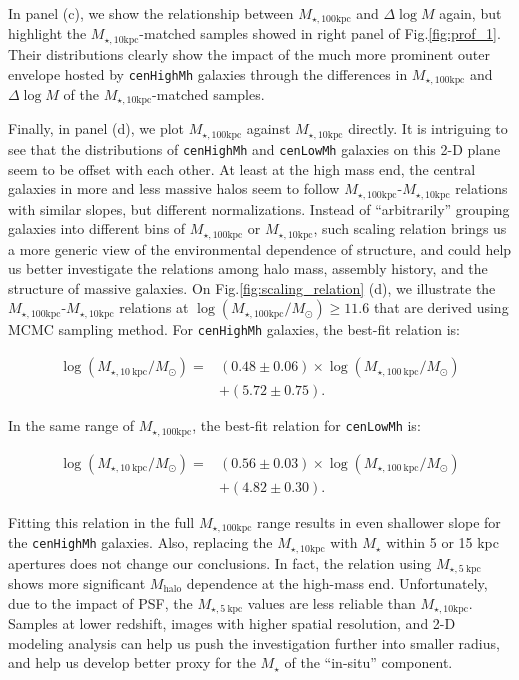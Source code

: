 \documentclass{emulateapj}
\def\rbcg{\texttt{cenHighMh}}
\def\nbcg{\texttt{cenLowMh}}
\def\mstar{{$M_{\star}$}}
\def\mhalo{{$M_{\mathrm{halo}}$}}
\def\minn{{$M_{\star,10\mathrm{kpc}}$}}
\def\mtot{{$M_{\star,100\mathrm{kpc}}$}}
\def\logmtot{{$\log (M_{\star,100\mathrm{kpc}}/M_{\odot})$}}
\begin{document}
\begin{CJK*}{UTF8}{gbsn}
    In panel (c), we show the relationship between \mtot{} and $\Delta \log M$ 
    again, but highlight the \minn{}-matched samples showed in right panel of 
    Fig.\ref{fig:prof_1}. 
    Their distributions clearly show the impact of the much more prominent outer 
    envelope hosted by \rbcg{} galaxies through the differences in \mtot{} and 
    $\Delta \log M$ of the \minn{}-matched samples.
    
    Finally, in panel (d), we plot \mtot{} against \minn{} directly.  
    It is intriguing to see that the distributions of \rbcg{} and \nbcg{} galaxies 
    on this 2-D plane seem to be offset with each other. 
    At least at the high mass end, the central galaxies in more and less massive 
    halos seem to follow \mtot{}-\minn{} relations with similar slopes, but different 
    normalizations.  
    Instead of ``arbitrarily'' grouping galaxies into different bins of \mtot{} or 
    \minn{}, such scaling relation brings us a more generic view of the environmental 
    dependence of structure, and could help us better investigate the relations among 
    halo mass, assembly history, and the structure of massive galaxies.
    On Fig.\ref{fig:scaling_relation} (d), we illustrate the \mtot{}-\minn{} relations 
    at \logmtot$\geq 11.6$ that are derived using MCMC sampling method.  
    For \rbcg{} galaxies, the best-fit relation is:
    
    \begin{equation}
        \begin{aligned}
        \log (M_{\star, 10\ \mathrm{kpc}}/M_{\odot}) = & (0.48\pm0.06) \times \log (M_{\star, 100\ \mathrm{kpc}}/M_{\odot}) \\ & +(5.72\pm0.75).
        \end{aligned}
    \end{equation}
    
    \noindent In the same range of \mtot{}, the best-fit relation for \nbcg{} is:
     
    \begin{equation}
        \begin{aligned}
        \log (M_{\star, 10\ \mathrm{kpc}}/M_{\odot}) = & (0.56\pm0.03) \times \log (M_{\star, 100\ \mathrm{kpc}}/M_{\odot}) \\ & +(4.82\pm0.30).
        \end{aligned}
    \end{equation}
     
    Fitting this relation in the full \mtot{} range results in even shallower slope for 
    the \rbcg{} galaxies. 
    Also, replacing the \minn{} with \mstar{} within 5 or 15 kpc apertures does not 
    change our conclusions. 
    In fact, the relation using $M_{\star, 5\ \mathrm{kpc}}$ shows more significant 
    \mhalo{} dependence at the high-mass end. 
    Unfortunately, due to the impact of PSF, the $M_{\star, 5\ \mathrm{kpc}}$ values 
    are less reliable than \minn{}. 
    Samples at lower redshift, images with higher spatial resolution, and 2-D modeling 
    analysis can help us push the investigation further into smaller radius, and help 
    us develop better proxy for the \mstar{} of the ``in-situ'' component.  
    

\end{CJK*}
\end{document}

